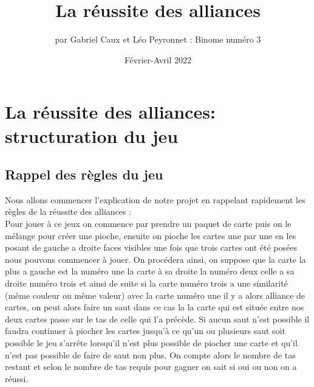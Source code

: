 \documentclass[10pt,a4paper,french,titlepage]{article}
\author{par Gabriel Caux et Léo Peyronnet : Binome numéro 3}
\title{La réussite des alliances}
\date{Février-Avril 2022}
\begin{document}
\maketitle
\tableofcontents
\section{La réussite des alliances: structuration du jeu}
\subsection{Rappel des règles du jeu}
Nous allons commencer l'explication de notre projet en rappelant rapidement les règles de la réussite des alliances :\\
Pour jouer à ce jeux on commence par prendre un paquet de carte puis on le mélange pour créer une pioche, ensuite on pioche les cartes une par une en les posant de gauche a droite faces visibles une fois que trois cartes ont été posées nous pouvons commencer à jouer. On procédera ainsi, on suppose que la carte la plus a gauche est la numéro une la carte à sa droite la numéro deux celle a sa droite numéro trois et ainsi de suite si la carte numéro trois a une  similarité (même couleur ou même valeur) avec la carte numéro une il y a alors alliance de cartes, on peut alors faire un saut dans ce cas la la carte qui est située entre nos deux cartes passe sur le tas de celle qui l'a précède. Si aucun saut n'est possible il faudra continuer à piocher les cartes jusqu'à ce qu'un ou plusieurs saut soit possible le jeu s'arrête lorsqu'il n'est plus possible de piocher une carte et qu'il n'est pas possible de faire de saut non plus. On compte alors le nombre de tas restant et selon le nombre de tas requis pour gagner on sait si oui ou non on a réussi.\\\\\\\\\\\\
\end{document}
